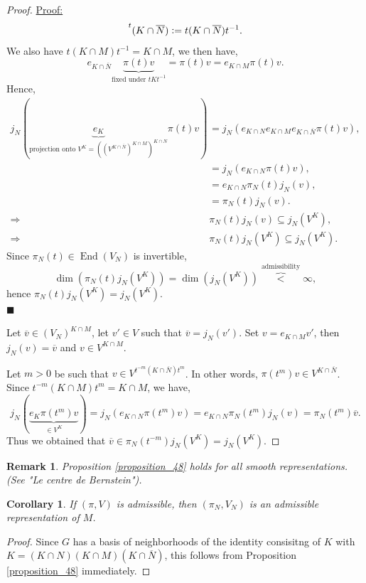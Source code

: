 \documentclass[8pt]{article}
\newenvironment{claimproof}[1]{\par\noindent\underline{Proof:}\space#1}{\hfill $\blacksquare$}
\newtheorem{remark}{Remark}[section]
\newtheorem{corollary}{Corollary} [section]
\DeclareMathOperator{\End}{End}
\newcommand{\defeq}{\vcentcolon=}
\begin{document}
\begin{proof}
\begin{claimproof}
  \begin{equation*}
    \prescript{t}{}{(K\cap\overline{N})}\defeq t(K\cap\overline{N})t^{-1}.
  \end{equation*}
  We also have $t(K\cap M)t^{-1} =K\cap M$, we then have,
  \begin{equation*}
    e_{K\cap\overline{N}}\underbrace{\pi(t)v}_{\text{fixed under $tKt^{-1}$}} = \pi(t)v = e_{K\cap M}\pi(t)v.
  \end{equation*}
  Hence,
  \begin{align*}
    j_N(\underbrace{e_K}_{\text{projection onto $V^K=((V^{K\cap \overline{N}})^{K\cap M})^{K\cap N}$}}\pi(t)v) &= j_N(e_{K\cap N}e_{K\cap M}e_{K\cap \overline{N}}\pi(t)v),\\
    & = j_N(e_{K\cap N}\pi(t)v),\\
    &=e_{K\cap N}\pi_N(t)j_N(v),\\
    & = \pi_N(t)j_N(v).\\
    \Rightarrow& \pi_N(t)j_N(v)\subseteq j_N(V^K),\\
    \Rightarrow & \pi_N(t)j_N(V^K) \subseteq j_N(V^K).
  \end{align*}
  Since $\pi_N(t)\in\End(V_N)$ is invertible,
  \begin{equation*}
  \dim(\pi_N(t)j_N(V^K)) = \dim (j_N(V^K))\overbrace{<}^{\text{admissibility}}\infty,
  \end{equation*}
  hence $\pi_N(t)j_N(V^K) = j_N(V^K)$.\\
\end{claimproof}
\par Let $\overline{v}\in (V_N)^{K\cap M}$, let $v'\in V$ such that $\overline{v} = j_N(v')$. Set $v = e_{K\cap M}v'$, then $j_N(v)=\overline{v}$ and $v\in V^{K\cap M}$.\\
\par Let $m>0$ be such that $v\in V^{t^{-m}(K\cap \overline{N})t^m}$. In other words, $\pi(t^m)v\in V^{K\cap \overline{N}}$. Since $t^{-m}(K\cap M)t^m = K\cap M$, we have,
\begin{equation*}
  j_N(\underbrace{e_K\pi(t^m)v}_{\in V^K})  = j_N(e_{K\cap N}\pi(t^m)v) = e_{K\cap N}\pi_N(t^m)j_N(v) = \pi_N(t^m)\overline{v}.
\end{equation*}
Thus we obtained that $\overline{v}\in\pi_N(t^{-m})j_N(V^K)=j_N(V^K)$.
\end{proof}
\begin{remark}
  Proposition \ref{proposition_48} holds for all smooth representations. (See "Le centre de Bernstein").
\end{remark}
\begin{corollary}
  \label{corollary_49}
  If $(\pi,V)$ is admissible, then $(\pi_N,V_N)$ is an admissible representation of $M$.
\end{corollary}
\begin{proof}
Since $G$ has a basis of neighborhoods of the identity consisitng of $K$ with $K= (K\cap N)(K\cap M)(K\cap \overline{N})$, this follows from Proposition \ref{proposition_48} immediately.
\end{proof}
\end{document}
